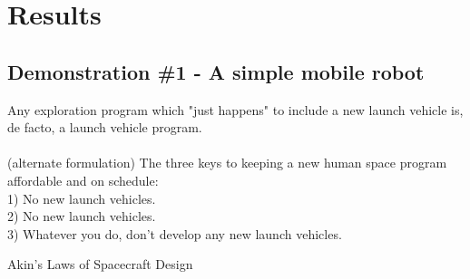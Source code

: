 \chapter{Results}

\section{Demonstration \#1 - A simple mobile robot}

\epigraph{
    Any exploration program which "just happens" to include a new launch vehicle is, de facto, a launch vehicle program. \\ \\
    (alternate formulation) The three keys to keeping a new human space program affordable and on schedule: \\
1)  No new launch vehicles. \\
2)  No new launch vehicles. \\
3)  Whatever you do, don't develop any new launch vehicles.\\}{Akin's Laws of
Spacecraft Design\cite{phillip_koopman_better_2010}}